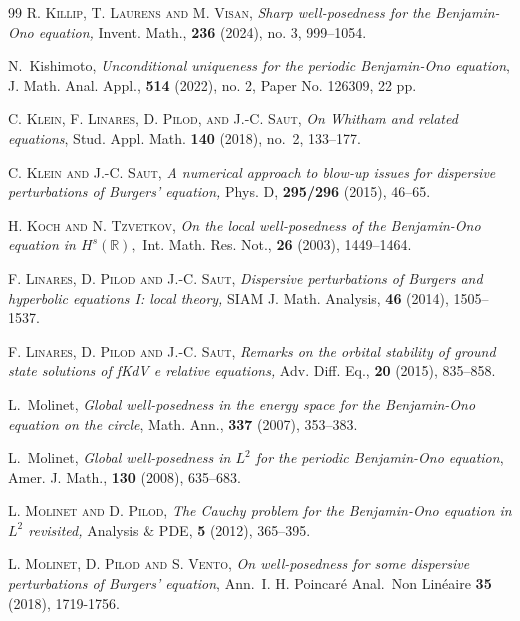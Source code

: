 \documentclass{amsart}
\theoremstyle{definition}
\theoremstyle{remark}
\numberwithin{equation}{section}
\begin{document}
\begin{thebibliography}{99}
\newblock \textsc{R. Killip, T. Laurens and M. Visan,}
\newblock \emph{ Sharp well-posedness for the Benjamin-Ono equation,}
\newblock Invent. Math., {\bf 236} (2024), no. 3, 999--1054.

{\sc N.~Kishimoto}, {\em Unconditional uniqueness for the periodic
  {B}enjamin-{O}no equation}, J. Math. Anal. Appl., {\bf 514} (2022), no. 2, Paper No. 126309, 22 pp.


\textsc{C. Klein, F. Linares, D. Pilod, and J.-C. Saut}, 
\emph{On {W}hitham and related equations}, Stud. Appl. Math. \textbf{140} (2018),
 no.~2, 133--177. 
 
  \textsc{C. Klein and J.-C. Saut},
\emph{A numerical approach to blow-up issues for dispersive perturbations of Burgers' equation,}  Phys. D, \textbf{295/296} (2015), 46--65.

\newblock \textsc{H. Koch and N. Tzvetkov,}
\newblock \emph{On the local well-posedness of the Benjamin-Ono equation in $H^s(\mathbb R),$}
\newblock Int. Math. Res. Not., \textbf{26} (2003), 1449--1464.

\newblock \textsc{F. Linares, D. Pilod and J.-C. Saut,}
\newblock \emph{Dispersive perturbations of Burgers and hyperbolic equations I: local theory,}
\newblock SIAM J. Math. Analysis, \textbf{46} (2014), 1505--1537.


\newblock \textsc{F. Linares, D. Pilod and J.-C. Saut,}
\newblock \emph{Remarks on the orbital stability of ground state solutions of fKdV e relative equations,}
\newblock  Adv. Diff. Eq., \textbf{20} (2015), 835--858.

{\sc L.~Molinet}, {\em Global well-posedness in the energy space for the
  {B}enjamin-{O}no equation on the circle}, Math. Ann., {\bf 337} (2007),
  353--383.
  
{\sc L.~Molinet}, {\em Global
  well-posedness in ${L}^2$ for the periodic {B}enjamin-{O}no equation}, Amer.
  J. Math., {\bf 130} (2008), 635--683.

\newblock \textsc{L. Molinet and D. Pilod,}
\newblock \emph{The Cauchy problem for the Benjamin-Ono equation in $L^2$
revisited,}
\newblock Analysis $\&$ PDE, \textbf{5} (2012), 365--395.

 \textsc{L. Molinet, D. Pilod and S. Vento}, 
\textit{On well-posedness for some dispersive perturbations of Burgers' equation},
  Ann.\ I. H. Poincar\'e Anal.\ Non Lin\'eaire \textbf{35} (2018), 1719-1756.


\end{thebibliography}
\end{document}
